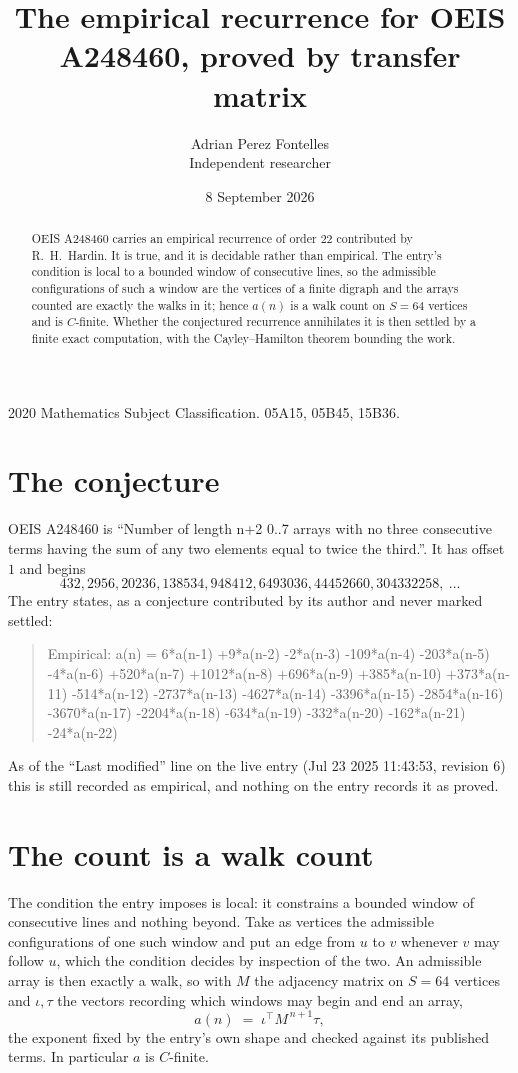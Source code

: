 \documentclass[11pt,a4paper]{article}
\title{The empirical recurrence for OEIS A248460, proved by transfer matrix}
\author{Adrian Perez Fontelles\\ \small Independent researcher}
\date{8 September 2026}
\theoremstyle{plain}
\theoremstyle{definition}
\begin{document}
\maketitle

\begin{abstract}
OEIS A248460 carries an empirical recurrence of order $22$ contributed by R.~H.~Hardin. It is
true, and it is decidable rather than empirical. The entry's condition is local to a bounded window of consecutive lines, so
the admissible configurations of such a window are the vertices of a finite digraph and the
arrays counted are exactly the walks in it; hence $a(n)$ is a walk count on $S=64$ vertices
and is $C$-finite. Whether the conjectured recurrence annihilates it is then settled by a
finite exact computation, with the Cayley--Hamilton theorem bounding the work.
\end{abstract}

\noindent\small 2020 Mathematics Subject Classification. 05A15, 05B45, 15B36.\normalsize

\section{The conjecture}

OEIS A248460 is ``Number of length n+2 0..7 arrays with no three consecutive terms having the sum of any two elements equal to twice the third.''. It has offset $1$ and begins
\[
432, 2956, 20236, 138534, 948412, 6493036, 44452660, 304332258,\ \dots
\]
The entry states, as a conjecture contributed by its author and never marked settled:
\begin{quote}
Empirical: a(n) = 6*a(n-1) +9*a(n-2) -2*a(n-3) -109*a(n-4) -203*a(n-5) -4*a(n-6) +520*a(n-7) +1012*a(n-8) +696*a(n-9) +385*a(n-10) +373*a(n-11) -514*a(n-12) -2737*a(n-13) -4627*a(n-14) -3396*a(n-15) -2854*a(n-16) -3670*a(n-17) -2204*a(n-18) -634*a(n-19) -332*a(n-20) -162*a(n-21) -24*a(n-22)
\end{quote}
As of the ``Last modified'' line on the live entry (Jul 23 2025 11:43:53, revision 6) this is still
recorded as empirical, and nothing on the entry records it as proved.

\section{The count is a walk count}

The condition the entry imposes is local: it constrains a bounded window of consecutive lines and nothing beyond. Take as
vertices the admissible configurations of one such window and put an edge from $u$ to $v$
whenever $v$ may follow $u$, which the condition decides by inspection of the two. An
admissible array is then exactly a walk, so with $M$ the adjacency matrix on $S=64$ vertices
and $\iota,\tau$ the vectors recording which windows may begin and end an array,
\[
a(n)\;=\;\iota^{\!\top}M^{\,n+1}\tau ,
\]
the exponent fixed by the entry's own shape and checked against its published terms. In
particular $a$ is $C$-finite.
\end{document}
